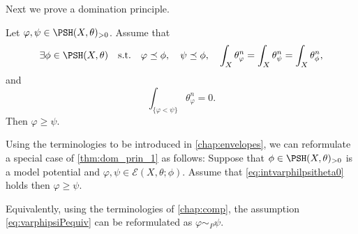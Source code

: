 Next we prove a domination principle.
\begin{theorem}\label{thm:dom_prin_1}
    Let $\varphi,\psi\in \PSH(X,\theta)_{>0}$. Assume that
    \begin{equation}\label{eq:varphipsiPequiv}
    \exists\phi\in \PSH(X,\theta)\quad \textup{s.t.} \quad \varphi\preceq \phi, \quad \psi\preceq \phi,\quad \int_X \theta_{\varphi}^n=\int_X \theta_{\psi}^n=\int_X \theta_{\phi}^n,
    \end{equation}
    and
    \begin{equation}\label{eq:intvarphilpsitheta0}
    \int_{\{\varphi<\psi\}} \theta_{\varphi}^n=0.
    \end{equation}
    Then $\varphi\geq \psi$.
\end{theorem}
\begin{remark}\label{rmk:npp:L982}
    Using the terminologies to be introduced in \cref{chap:envelopes}, we can reformulate a special case of \cref{thm:dom_prin_1} as follows: Suppose that $\phi\in \PSH(X,\theta)_{>0}$ is a model potential and $\varphi,\psi\in \mathcal{E}(X,\theta;\phi)$. Assume that \eqref{eq:intvarphilpsitheta0} holds then $\varphi\geq \psi$.

    Equivalently, using the terminologies of \cref{chap:comp}, the assumption \eqref{eq:varphipsiPequiv} can be reformulated as $\varphi\sim_P \psi$.
\end{remark}

